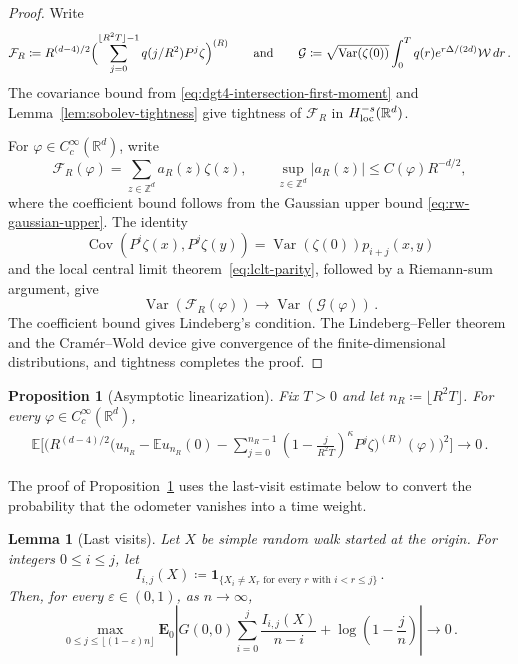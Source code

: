 \documentclass[11pt]{amsart}
\theoremstyle{plain}
\newtheorem{proposition}[theorem]{Proposition}
\newtheorem{lemma}[theorem]{Lemma}
\theoremstyle{definition}
\newcommand{\Z}{\mathbb{Z}}
\newcommand{\R}{\mathbb{R}}
\newcommand{\E}{\mathbb{E}}
\DeclareMathOperator{\Var}{Var}
\DeclareMathOperator{\Cov}{Cov}
\newcommand{\one}{\mathbf{1}}
\begin{document}
\begin{proof}
	Write
	\[
		\mathcal F_R\coloneqq R^{(d-4)/2}\Bigl(\sum_{j=0}^{\lfloor R^2T\rfloor-1}q(j/R^2)P^j\zeta\Bigr)^{(R)}
		\qquad\text{and}\qquad
		\mathcal G\coloneqq\sqrt{\Var(\zeta(0))}\int_0^Tq(r)e^{r\Delta/(2d)}\mathcal W\,dr\, .
	\]
	The covariance bound from \eqref{eq:dgt4-intersection-first-moment} and
	Lemma~\ref{lem:sobolev-tightness} give tightness of $\mathcal F_R$ in
	$H^{-s}_{\rm loc}(\R^d)$.

	For $\varphi\in C_c^\infty(\R^d)$, write
	\[
	\mathcal F_R(\varphi)=\sum_{z\in\Z^d}a_R(z)\zeta(z),
	\qquad
	\sup_{z\in\Z^d}|a_R(z)|\leq C(\varphi)R^{-d/2},
	\]
	where the coefficient bound follows from the Gaussian upper bound
	\eqref{eq:rw-gaussian-upper}.
	The identity
	\[
	\Cov(P^i\zeta(x),P^j\zeta(y))=\Var(\zeta(0))p_{i+j}(x,y)
	\]
	and the local central limit theorem~\eqref{eq:lclt-parity}, followed by a
	Riemann-sum argument, give
	\[
	\Var(\mathcal F_R(\varphi))
	\longrightarrow\Var(\mathcal G(\varphi))\, .
	\]
	The coefficient bound gives Lindeberg's condition. The Lindeberg--Feller theorem and the Cram\'er--Wold device give convergence of the finite-dimensional
	distributions, and tightness completes the proof.
\end{proof}

\begin{proposition}[Asymptotic linearization]\label{prop:dgt4-linearization}
	Fix $T>0$ and let $n_R\coloneqq\lfloor R^2T\rfloor$. For every
	$\varphi\in C_c^\infty(\R^d)$,
	\begin{equation}\label{eq:dgt4-linear-approximation}
	\begin{aligned}
		\E\Biggl[\Biggl(
		R^{(d-4)/2}
		\Biggl(
		u_{n_R}-\E u_{n_R}(0)
		-\sum_{j=0}^{n_R-1}
		\left(1-\frac{j}{R^2T}\right)^\kappa P^j\zeta
		\Biggr)^{(R)}(\varphi)
		\Biggr)^2\Biggr]
		\longrightarrow0\, .
	\end{aligned}
	\end{equation}
\end{proposition}

	The proof of Proposition~\ref{prop:dgt4-linearization} uses the last-visit
	estimate below to convert the probability that the odometer vanishes into a
	time weight.

\begin{lemma}[Last visits]\label{lem:dgt4-weighted-last-visits}
	Let $X$ be simple random walk started at the origin. For integers
	$0\leq i\leq j$, let
	\[
		I_{i,j}(X)
		\coloneqq
	\one_{\{X_i\ne X_r\text{ for every }r\text{ with }i<r\leq j\}}\, .
	\]
	Then, for every $\varepsilon\in(0,1)$, as $n\to\infty$,
	\[
		\max_{0\leq j\leq\lfloor(1-\varepsilon)n\rfloor}
		\mathbf E_0\left|
		G(0,0)\sum_{i=0}^j\frac{I_{i,j}(X)}{n-i}
		+\log\left(1-\frac jn\right)
		\right|\longrightarrow0\, .
	\]
\end{lemma}
\end{document}
